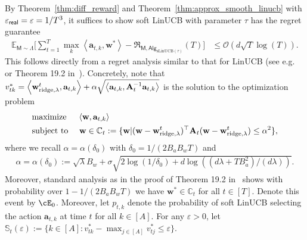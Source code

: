 \documentclass[10pt]{article}
\renewcommand{\epsilon}{\varepsilon}
\newcommand{\eps}{\varepsilon}
\renewcommand{\cO}{\mathcal{O}}
\newcommand{\<}{\left\langle}
\renewcommand{\>}{\right\rangle}
\newcommand{\ridge}{{\rm ridge}}
\newcommand{\E}{\mathbb{E}}
\newcommand{\inst}{{\mathsf{M}}}
\newcommand{\sLinUCB}{{\mathrm{sLinUCB}}}
\newcommand{\temp}{{\tau}}
\newcommand{\cwid}{{\alpha}}
\newcommand{\totlen}{{T}}
\newcommand{\sAlg}{{\mathsf{Alg}}}
\newcommand{\prior}{{\Lambda}}
\newcommand{\geneps}{{\epsilon}_{\sf real}}
\newcommand{\totreward}{{\mathfrak{R}}}
\def\sC{{\mathbb{C}}}
\def\sS{{\mathbb{S}}}
\def\bA{{\mathbf A}}
\def\ba{{\mathbf a}}
\def\bw{{\mathbf w}}
\begin{document}
By Theorem~\ref{thm:diff_reward} and Theorem~\ref{thm:approx_smooth_linucb} with ${\geneps=\eps=1/\totlen^3}$, it suffices to show soft LinUCB with parameter $\temp$ has the regret guarantee \begin{align*}
\E_{\inst\sim\prior}\Big[\sum_{t=1}^\totlen\max_{k}\<\ba_{t,k},\bw^*\>-\totreward_{\inst,\sAlg_{\sLinUCB(\temp)}}(\totlen)\Big]&\leq\cO(d\sqrt{T}\log(T)).
\end{align*}
This follows directly from a  regret analysis similar to  that for LinUCB (see e.g.~\cite{chu2011contextual} or  Theorem 19.2 in~\cite{lattimore2020bandit}). Concretely, note that $v_{tk}^*=\<\bw^t_{\ridge,\lambda},\ba_{t,k}\>+\alpha\sqrt{\<\ba_{t,k}, {\bA_t^{-1} \ba_{t,k}}\>}$ is the solution to the optimization problem 
\begin{align*}&\text{maximize }~~~\<\bw,\ba_{t,k}\>
\\
&\text{subject to }~~~\bw\in \sC_t:=\{\bw|(\bw-\bw^t_{\ridge,\lambda})^\top\bA_t(\bw-\bw^t_{\ridge,\lambda})\leq\alpha^2\},
\end{align*}
where we recall $\alpha=\alpha(\delta_0)$ with $\delta_0=1/(2B_aB_wT)$ and
\begin{align}
\cwid=\cwid(\delta_0):=\sqrt{\lambda}B_w+\sigma\sqrt{2\log(1/\delta_0)+d\log((d\lambda+TB_a^2)/(d\lambda))}.\label{eq:recall_alpha_formula}
\end{align}
Moreover, standard analysis as in the proof of Theorem 19.2 in~\cite{lattimore2020bandit} shows with probability over $1-1/(2B_aB_wT)$ we have $\bw^*\in\sC_t$ for all $t\in[T]$. Denote this event by $\cE_0$. Moreover, let $p_{t,k}$ denote the probability of soft LinUCB selecting the action $\ba_{t,k}$ at time $t$ for all $k\in[A]$.  For any $\eps>0$, let $\sS_t(\eps):=\{k\in[A]:v^*_{tk}-\max_{j\in[A]}v^*_{tj}\leq \eps\}$. 
\end{document}
